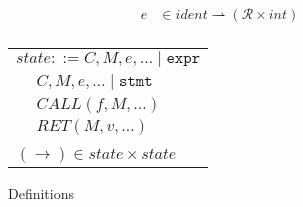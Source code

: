 \documentclass{article}
\begin{document}
\begin{figure}
\begin{minipage}[t]{0.49\textwidth}
\[\begin{aligned}
    e & \in \mathit{ident} \rightharpoonup (\mathcal{R} \times \mathit{int}) \\
    \end{aligned}\]
    \begin{tabular}{l | l}
      \multicolumn{2}{r}{\(\mathit{state} ::= C, M, e, \ldots \mid \mathtt{expr}\)} \\
      \hspace{4em} & \(C, M, e, \ldots \mid \mathtt{stmt}\) \\
      \hspace{4em} & \(\mathit{CALL}(f, M, \ldots)\)  \\
      \hspace{4em} & \(\mathit{RET}(M, v, \ldots)\) \\
      \multicolumn{2}{l}{} \\
      \multicolumn{2}{l}{\hspace{1.5em}\((\longrightarrow) \in \mathit{state} \times \mathit{state}\)} \\
    \end{tabular}
  \end{minipage}

  \caption{Definitions}
  \label{subfig:defs}
  \label{fig:memmod}
\end{figure}
\end{document}
